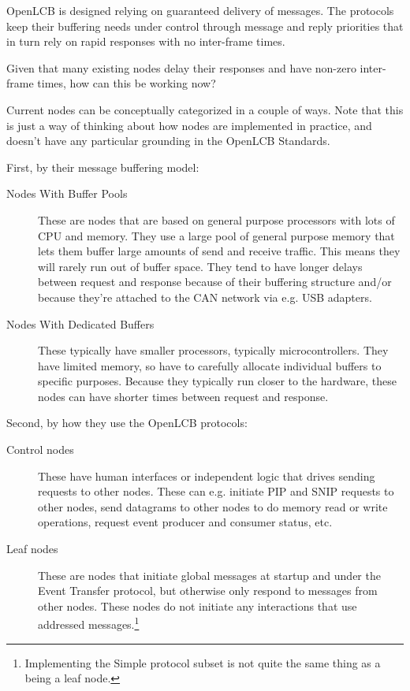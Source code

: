 \documentclass[11pt]{article}
\begin{document}
OpenLCB is designed relying on guaranteed delivery of messages.
The protocols keep their buffering needs under control through
message and reply priorities that in turn rely on 
rapid responses with no inter-frame times.

Given that many existing nodes delay their responses and 
have non-zero inter-frame times, how can this be working now?

Current nodes can be conceptually categorized in a couple of ways.
Note that this is just a way of thinking about how nodes
are implemented in practice, and doesn't have any particular
grounding in the OpenLCB Standards.

\cbend

First, by their message buffering model:

\begin{description}
\item[Nodes With Buffer Pools]
These are nodes that are based on general purpose processors
with lots of CPU and memory. 
They use a large pool of general purpose
memory that lets them buffer large amounts of 
send and receive traffic. This means they will rarely
run out of buffer space. They tend to have longer
delays between request and response because of their
buffering structure and/or because they're attached
to the CAN network via e.g. USB adapters.

\item[Nodes With Dedicated Buffers]
These typically have smaller processors, 
typically microcontrollers.  They have limited
memory, so have to carefully allocate individual 
buffers to specific purposes. Because they
typically run closer to the hardware, these nodes
can have shorter times between request and response.

\end{description}


Second, by how they use the OpenLCB 
protocols:

\begin{description}

\item[Control nodes]

These have human interfaces or independent logic that drives sending requests to other nodes.
These can e.g. initiate PIP and SNIP requests to other nodes, send datagrams to other nodes
to do memory read or write operations, request event producer and consumer status, etc.

\item[Leaf nodes]

These are nodes that initiate global messages at startup and under the Event Transfer protocol, 
but otherwise only respond to messages from other nodes.
These nodes do not initiate any interactions that use addressed 
messages.\footnote{Implementing the Simple protocol subset is 
    not quite the same thing as a being a leaf node.}

\end{description}
\end{document}
